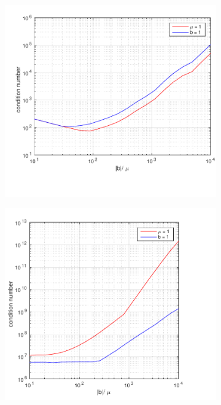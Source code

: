 \begin{figure}[h!]
  \centering
  \begin{subfigure}[b]{0.48\textwidth}
		\includegraphics[width=\textwidth]{Figures/Spec_difftrans_ConditionNumber.pdf}
  \end{subfigure}%
  \quad
  \begin{subfigure}[b]{0.48\textwidth}
		\includegraphics[width=\textwidth]{Figures/Spec-LS_difftrans_ConditionNumber.pdf}

\end{subfigure}
\end{figure}
